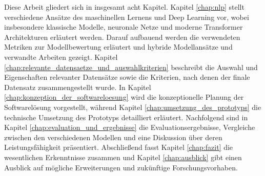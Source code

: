 Diese Arbeit gliedert sich in insgesamt acht Kapitel. 
Kapitel \ref{chap:nlp} stellt verschiedene Ansätze des maschinellen Lernens und Deep Learning vor, 
wobei insbesondere klassische Modelle, neuronale Netze und moderne Transformer Architekturen erläutert werden. 
Darauf aufbauend werden die verwendeten Metriken zur Modellbewertung erläutert und hybride Modellansätze und verwandte Arbeiten gezeigt.
Kapitel \ref{chap:relevante_datensaetze_und_auswahlkriterien} beschreibt die Auswahl und Eigenschaften relevanter Datensätze sowie die Kriterien, 
nach denen der finale Datensatz zusammengestellt wurde. 
In Kapitel \ref{chap:konzeption_der_softwareloesung} wird die konzeptionelle Planung der Softwarelösung vorgestellt, 
während Kapitel \ref{chap:umsetzung_des_prototyps} die technische Umsetzung des Prototyps detailliert erläutert.
Nachfolgend sind in Kapitel \ref{chap:evaluation_und_ergebnisse} die Evaluationsergebnisse, Vergleiche zwischen den verschiedenen Modellen und 
eine Diskussion über deren Leistungsfähigkeit präsentiert.
Abschließend fasst Kapitel \ref{chap:fazit} die wesentlichen Erkenntnisse zusammen und 
Kapitel \ref{chap:ausblick} gibt einen Ausblick auf mögliche Erweiterungen und zukünftige Forschungsvorhaben.



